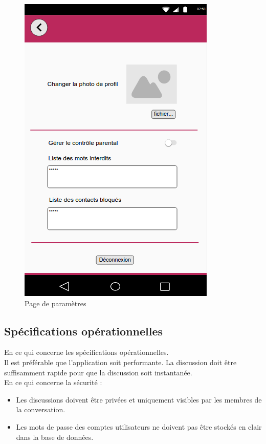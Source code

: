 	\begin{figure}[H]
		\centering \includegraphics[scale=0.5]{img/Parametres.png}
		\caption{Page de paramètres}
	\end{figure}


\subsection{Spécifications opérationnelles}

En ce qui concerne les spécifications opérationnelles. \\

Il est préférable que l'application soit performante. La discussion doit être suffisamment rapide pour que la discussion soit instantanée. \\

En ce qui concerne la sécurité : \\

\begin{itemize}
	\item Les discussions doivent être privées et uniquement visibles par les membres de la conversation.
	\item Les mots de passe des comptes utilisateurs ne doivent pas être stockés en clair dans la base de données.
\end{itemize}
